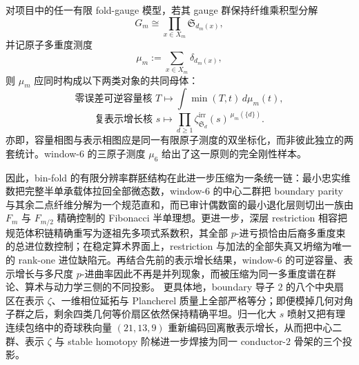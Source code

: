 \begin{conjecture}\label{conj:conclusion-foldbin-stieltjes-representation-rigidity}
对项目中的任一有限 fold-gauge 模型，若其 gauge 群保持纤维乘积型分解
\[
G_m\cong \prod_{x\in X_m}\mathfrak S_{d_m(x)},
\]
并记原子多重度测度
\[
\mu_m:=\sum_{x\in X_m}\delta_{d_m(x)},
\]
则 \(\mu_m\) 应同时构成以下两类对象的共同母体：
\[
\text{零误差可逆容量核 }T\longmapsto \int \min(T,t)\,d\mu_m(t),
\]
\[
\text{复表示增长核 }s\longmapsto \prod_{d\ge 1}\zeta_{\mathfrak S_d}^{\mathrm{irr}}(s)^{\,\mu_m(\{d\})}.
\]
亦即，容量相图与表示相图应是同一有限原子测度的双坐标化，而非彼此独立的两套统计。window-\(6\) 的三原子测度 \(\mu_6\) 给出了这一原则的完全刚性样本。
\end{conjecture}




\noindent
因此，bin-fold 的有限分辨率群胚结构在此进一步压缩为一条统一链：最小忠实维数把完整半单承载体拉回全部微态数，window-\(6\) 的中心二群把 boundary parity 与其余二点纤维分解为一个规范直和，而已审计偶数窗的最小退化层则切出一族由 \(F_m\) 与 \(F_{m/2}\) 精确控制的 Fibonacci 半单理想。更进一步，深层 restriction 相容把规范体积链精确重写为逐祖先多项式系数积，其全部 \(p\)-进亏损恰由后裔多重度束的总进位数控制；在稳定算术界面上，restriction 与加法的全部失真又坍缩为唯一的 rank-one 进位缺陷元。再结合先前的表示增长结果，window-\(6\) 的可逆容量、表示增长与多尺度 \(p\)-进曲率因此不再是并列现象，而被压缩为同一多重度谱在群论、算术与动力学三侧的不同投影。
更具体地，boundary 导子 \(2\) 的八个中央扇区在表示 \(\zeta\)、一维相位延拓与 Plancherel 质量上全部严格等分；即便模掉几何对角子群之后，剩余四类几何等价扇区依然保持精确平坦。归一化大 \(s\) 喷射又把有理连续包络中的奇球秩向量 \((21,13,9)\) 重新编码回离散表示增长，从而把中心二群、表示 \(\zeta\) 与 stable homotopy 阶梯进一步焊接为同一 conductor-\(2\) 骨架的三个投影。

\endinput
